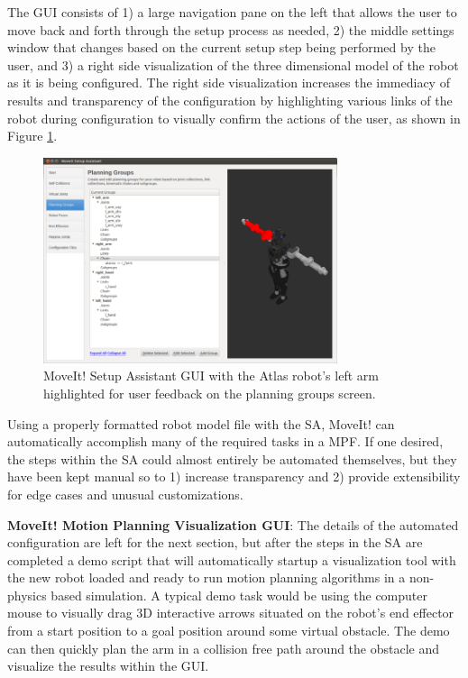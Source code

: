 \documentclass[10pt,journal,compsoc]{joser1}
\begin{document}
{The GUI consists of 1) a large navigation pane on the left that allows the user to move back and forth through the setup process as needed, 2) the middle settings window that changes based on the current setup step being performed by the user, and 3) a right side visualization of the three dimensional model of the robot as it is being configured. The right side visualization increases the immediacy of results and transparency of the configuration by highlighting various links of the robot during configuration to visually confirm the actions of the user, as shown in Figure \ref{fig:setupassistant3}.

\begin{figure}[!t]
\centering
\includegraphics[width=3.4in]{images/setup_assistant3}
\caption{MoveIt! Setup Assistant GUI with the Atlas robot's left arm highlighted for user feedback on the planning groups screen.}
\label{fig:setupassistant3}	
\end{figure}

Using a properly formatted robot model file with the SA, MoveIt! can automatically accomplish many of the required tasks in a MPF. If one desired, the steps within the SA could almost entirely be automated themselves, but they have been kept manual so to 1) increase transparency and 2) provide extensibility for edge cases and unusual customizations.

{\bf MoveIt! Motion Planning Visualization GUI}: The details of the automated configuration are left for the next section, but after the steps in the SA are completed a demo script that will automatically startup a visualization tool with the new robot loaded and ready to run motion planning algorithms in a non-physics based simulation. A typical demo task would be using the computer mouse to visually drag 3D interactive arrows situated on the robot's end effector from a start position to a goal position around some virtual obstacle. The demo can then quickly plan the arm in a collision free path around the obstacle and visualize the results within the GUI. 

}
\end{document}
